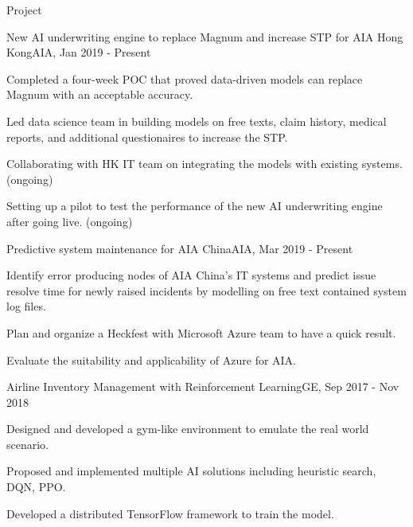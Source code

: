 \documentclass{resume} %
\begin{document}
\begin{rSection}{Project}

\begin{rSubsection}{New AI underwriting engine to replace Magnum and increase STP for AIA Hong Kong}{}{AIA, Jan 2019 - Present}{}
\item Completed a four-week POC that proved data-driven models can replace Magnum with an acceptable accuracy.
\item Led data science team in building models on free texts, claim history, medical reports, and additional questionaires to increase the STP.  
\item Collaborating with HK IT team on integrating the models with existing systems. (ongoing)
\item Setting up a pilot to test the performance of the new AI underwriting engine after going live. (ongoing)
\end{rSubsection}


\begin{rSubsection}{Predictive system maintenance for AIA China}{}{AIA, Mar 2019 - Present}{}
\item Identify error producing nodes of AIA China's IT systems and predict issue resolve time for newly raised incidents by modelling on free text contained system log files.
\item Plan and organize a Heckfest with Microsoft Azure team to have a quick result.
\item Evaluate the suitability and applicability of Azure for AIA. 
\end{rSubsection}


\begin{rSubsection}{Airline Inventory Management with Reinforcement Learning}{}{GE, Sep 2017 - Nov 2018}{}
\item Designed and developed a gym-like environment to emulate the real world scenario.
\item Proposed and implemented multiple AI solutions including heuristic search, DQN, PPO.
\item Developed a distributed TensorFlow framework to train the model.
\end{rSubsection}



\end{rSection}
\end{document}
